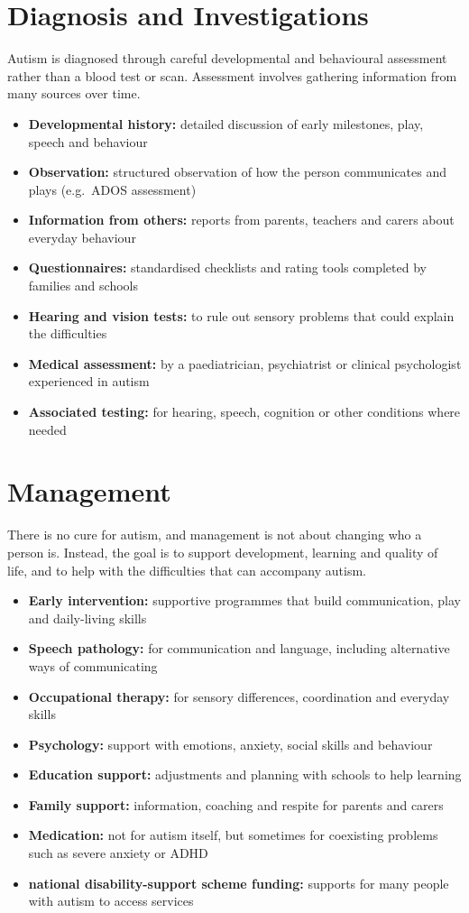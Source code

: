 \section*{Diagnosis and Investigations}
Autism is diagnosed through careful developmental and behavioural assessment rather than a blood test or scan. Assessment involves gathering information from many sources over time.

\begin{itemize}
    \item \textbf{Developmental history:} detailed discussion of early milestones, play, speech and behaviour
    \item \textbf{Observation:} structured observation of how the person communicates and plays (e.g.\ ADOS assessment)
    \item \textbf{Information from others:} reports from parents, teachers and carers about everyday behaviour
    \item \textbf{Questionnaires:} standardised checklists and rating tools completed by families and schools
    \item \textbf{Hearing and vision tests:} to rule out sensory problems that could explain the difficulties
    \item \textbf{Medical assessment:} by a paediatrician, psychiatrist or clinical psychologist experienced in autism
    \item \textbf{Associated testing:} for hearing, speech, cognition or other conditions where needed
\end{itemize}

\section*{Management}
There is no cure for autism, and management is not about changing who a person is. Instead, the goal is to support development, learning and quality of life, and to help with the difficulties that can accompany autism.

\begin{itemize}
    \item \textbf{Early intervention:} supportive programmes that build communication, play and daily-living skills
    \item \textbf{Speech pathology:} for communication and language, including alternative ways of communicating
    \item \textbf{Occupational therapy:} for sensory differences, coordination and everyday skills
    \item \textbf{Psychology:} support with emotions, anxiety, social skills and behaviour
    \item \textbf{Education support:} adjustments and planning with schools to help learning
    \item \textbf{Family support:} information, coaching and respite for parents and carers
    \item \textbf{Medication:} not for autism itself, but sometimes for coexisting problems such as severe anxiety or ADHD
    \item \textbf{national disability-support scheme funding:} supports for many people with autism to access services
\end{itemize}

